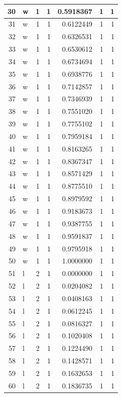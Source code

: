 \documentclass[
  letterpaper,
  DIV=11,
  numbers=noendperiod]{scrreprt}
\begin{document}
\begin{table}
\begin{tabular}[t]{r|l|r|r|r|r|r}
\hline
30 & w & 1 & 1 & 0.5918367 & 1 & 1\\
\hline
31 & w & 1 & 1 & 0.6122449 & 1 & 1\\
\hline
32 & w & 1 & 1 & 0.6326531 & 1 & 1\\
\hline
33 & w & 1 & 1 & 0.6530612 & 1 & 1\\
\hline
34 & w & 1 & 1 & 0.6734694 & 1 & 1\\
\hline
35 & w & 1 & 1 & 0.6938776 & 1 & 1\\
\hline
36 & w & 1 & 1 & 0.7142857 & 1 & 1\\
\hline
37 & w & 1 & 1 & 0.7346939 & 1 & 1\\
\hline
38 & w & 1 & 1 & 0.7551020 & 1 & 1\\
\hline
39 & w & 1 & 1 & 0.7755102 & 1 & 1\\
\hline
40 & w & 1 & 1 & 0.7959184 & 1 & 1\\
\hline
41 & w & 1 & 1 & 0.8163265 & 1 & 1\\
\hline
42 & w & 1 & 1 & 0.8367347 & 1 & 1\\
\hline
43 & w & 1 & 1 & 0.8571429 & 1 & 1\\
\hline
44 & w & 1 & 1 & 0.8775510 & 1 & 1\\
\hline
45 & w & 1 & 1 & 0.8979592 & 1 & 1\\
\hline
46 & w & 1 & 1 & 0.9183673 & 1 & 1\\
\hline
47 & w & 1 & 1 & 0.9387755 & 1 & 1\\
\hline
48 & w & 1 & 1 & 0.9591837 & 1 & 1\\
\hline
49 & w & 1 & 1 & 0.9795918 & 1 & 1\\
\hline
50 & w & 1 & 1 & 1.0000000 & 1 & 1\\
\hline
51 & l & 2 & 1 & 0.0000000 & 1 & 1\\
\hline
52 & l & 2 & 1 & 0.0204082 & 1 & 1\\
\hline
53 & l & 2 & 1 & 0.0408163 & 1 & 1\\
\hline
54 & l & 2 & 1 & 0.0612245 & 1 & 1\\
\hline
55 & l & 2 & 1 & 0.0816327 & 1 & 1\\
\hline
56 & l & 2 & 1 & 0.1020408 & 1 & 1\\
\hline
57 & l & 2 & 1 & 0.1224490 & 1 & 1\\
\hline
58 & l & 2 & 1 & 0.1428571 & 1 & 1\\
\hline
59 & l & 2 & 1 & 0.1632653 & 1 & 1\\
\hline
60 & l & 2 & 1 & 0.1836735 & 1 & 1\\

\end{tabular}
\end{table}
\end{document}

